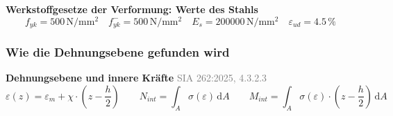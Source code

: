 \documentclass[11pt,a4paper]{article}
\newcommand{\normref}[1]{{\small\textcolor{gray}{#1}}}
\begin{document}
\noindent\textbf{Werkstoffgesetze der Verformung: Werte des Stahls}
\begin{equation*}
f_{yk} = 500\,\mathrm{N}/\mathrm{mm}^{2} \quad f_{yk}^{-} = 500\,\mathrm{N}/\mathrm{mm}^{2} \quad E_s = 200000\,\mathrm{N}/\mathrm{mm}^{2} \quad \varepsilon_{ud} = 4.5\,\%
\end{equation*}
\subsubsection{Wie die Dehnungsebene gefunden wird}
\noindent\textbf{Dehnungsebene und innere Kräfte} \hfill \normref{SIA 262:2025, 4.3.2.3}
\begin{equation*}
\varepsilon(z) = \varepsilon_m + \chi \cdot \left(z - \frac{h}{2}\right) \qquad N_{int} = \int_A \sigma\left(\varepsilon\right)\,\mathrm{d}A \qquad M_{int} = \int_A \sigma\left(\varepsilon\right) \cdot \left(z - \frac{h}{2}\right)\,\mathrm{d}A
\end{equation*}
\end{document}
